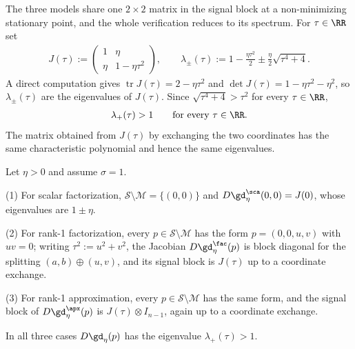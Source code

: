 \documentclass{article}
\begin{document}
The three models share one $2\times2$ matrix in the signal block at a
non-minimizing stationary point, and the whole verification reduces to its
spectrum. For $\tau\in\RR$ set
\begin{align}
    J(\tau)
    :=
    \begin{pmatrix}
        1 & \eta\\
        \eta & 1-\eta\tau^2
    \end{pmatrix},
    \qquad
    \lambda_\pm(\tau)
    :=
    1-\frac{\eta\tau^2}{2}
    \pm
    \frac{\eta}{2}\sqrt{\tau^4+4}.
    \label{eq:nonmin_block}
\end{align}
A direct computation gives $\operatorname{tr}J(\tau)=2-\eta\tau^2$ and
$\det J(\tau)=1-\eta\tau^2-\eta^2$, so $\lambda_\pm(\tau)$ are the eigenvalues of
$J(\tau)$. Since $\sqrt{\tau^4+4}>\tau^2$ for every $\tau\in\RR$,
\begin{align}
    \lambda_+(\tau)>1
    \qquad\text{for every }\tau\in\RR .
    \label{eq:nonmin_expanding}
\end{align}
The matrix obtained from $J(\tau)$ by exchanging the two coordinates has the
same characteristic polynomial and hence the same eigenvalues.

\begin{lemma}
\label{lem:nonmin_unstable}
Let $\eta>0$ and assume $\sigma=1$.

(1) For scalar factorization, $\mathcal S\setminus\mathcal M=\{(0,0)\}$ and
$D\gd_\eta^\sca(0,0)=J(0)$, whose eigenvalues are $1\pm\eta$.

(2) For rank-1 factorization, every $p\in\mathcal S\setminus\mathcal M$ has
the form $p=(0,0,u,v)$ with $uv=0$; writing $\tau^2:=u^2+v^2$, the Jacobian
$D\gd_\eta^\fac(p)$ is block diagonal for the splitting $(a,b)\oplus(u,v)$, and
its signal block is $J(\tau)$ up to a coordinate exchange.

(3) For rank-1 approximation, every $p\in\mathcal S\setminus\mathcal M$ has
the same form, and the signal block of $D\gd_\eta^\apx(p)$ is
$J(\tau)\otimes I_{n-1}$, again up to a coordinate exchange.

In all three cases $D\gd_\eta(p)$ has the eigenvalue $\lambda_+(\tau)>1$.
\end{lemma}
\end{document}
